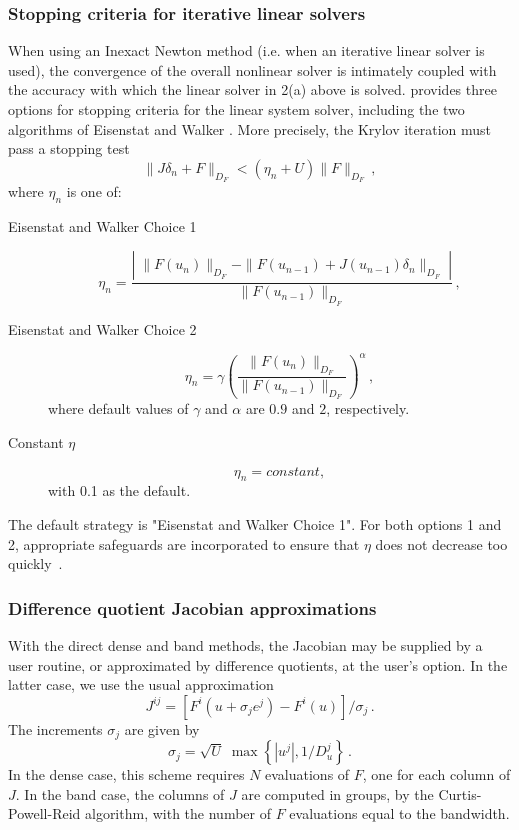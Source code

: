 \subsubsection*{Stopping criteria for iterative linear solvers}
When using an Inexact Newton method (i.e. when an iterative linear solver is 
used), the convergence of the overall nonlinear solver is intimately coupled
with the accuracy with which the linear solver in 2(a) above is solved.
{\kinsol} provides three options for stopping criteria for the linear system 
solver, including the two algorithms of Eisenstat and Walker \cite{EiWa:96}. 
More precisely, the Krylov iteration must pass a stopping test
\[ \|J \delta_n + F\|_{D_F} < (\eta_n + U) \|F\|_{D_F} \, , \]
where $\eta_n$ is one of:
\begin{description}
\item[Eisenstat and Walker Choice 1]
  \[
  \eta_n = \frac{\left|\; \|F(u_n)\|_{D_F}
      - \|F(u_{n-1}) + J(u_{n-1}) \delta_n \|_{D_F}
      \; \right|}
  {\|F(u_{n-1})\|_{D_F}} \, ,
  \]
\item[Eisenstat and Walker Choice 2]
  \[
  \eta_n = \gamma
  \left( \frac{ \|F(u_n)\|_{D_F}}{\|F(u_{n-1})\|_{D_F}} \right)^{\alpha} \, ,
  \]
where default values of $\gamma$ and $\alpha$ are $0.9$ and $2$,
respectively.
\item[Constant $\eta$]
  \[
  \eta_n = constant,
  \]
with 0.1 as the default.
\end{description}
The default strategy is "Eisenstat and Walker Choice 1". 
For both options 1 and 2, appropriate safeguards are incorporated to ensure that
$\eta$ does not decrease too quickly~\cite{EiWa:96}.


\subsubsection*{Difference quotient Jacobian approximations}
With the direct dense and band methods, the Jacobian may be supplied
by a user routine, or approximated by difference quotients,
at the user's option.  In the latter case, we use the usual
approximation
\begin{equation}\label{e:JacDQ}
  J^{ij} = [F^i(u+\sigma_j e^j) - F^i(u)]/\sigma_j \, .
\end{equation}
The increments $\sigma_j$ are given by
\begin{equation}\label{e:sigmaDQ_direct}
  \sigma_j = \sqrt{U} \; \max\left\{ |u^j| , 1/D_u^j \right\} \, .
\end{equation}
In the dense case, this scheme requires $N$ evaluations of $F$, 
one for each column of $J$.  In the band case, the columns of 
$J$ are computed in groups, by the Curtis-Powell-Reid algorithm, 
with the number of $F$ evaluations equal to the bandwidth.

